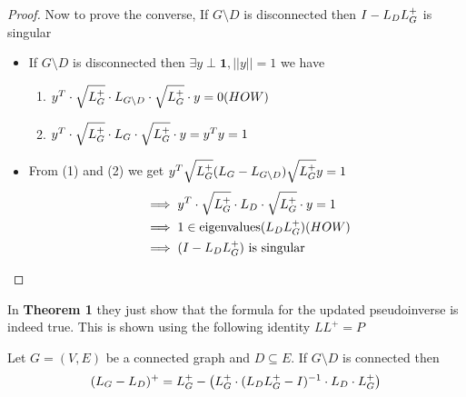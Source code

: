 \begin{proof}
Now to prove the converse, If $G \setminus D$ is disconnected then $I - L_D L_{G}^{+}$ is singular

\begin{itemize}
 \item If $G \setminus D$ is disconnected then $\exists y \perp \textbf{1}, ||y|| = 1$ we have
    
    \begin{enumerate}
     \item $ y^T \cdot \sqrt{L_{G}^{+}} \cdot L_{G \setminus D} \cdot \sqrt{L_{G}^{+}} \cdot y = 0 (HOW) $
     \item $ y^T \cdot \sqrt{L_{G}^{+}} \cdot L_G \cdot \sqrt{L_{G}^{+}} \cdot y = y^T y = 1 $
    \end{enumerate}
    
\item From (1) and (2) we get $y^T \sqrt{L_{G}^{+}} (L_G - L_{G \setminus D}) \sqrt{L_{G}^{+}} y= 1$
\begin{alignat}{1}
 & \implies y^T \cdot \sqrt{L_{G}^{+}} \cdot L_D \cdot \sqrt{L_{G}^{+}} \cdot y = 1 \\
 & \implies 1 \in \text{eigenvalues}(L_DL_{G}^{+}) (HOW)\\
 & \implies (I - L_DL_{G}^{+}) \text{ is singular}
\end{alignat}

\end{itemize}




\end{proof}



In \textbf{Theorem 1} they just show that the formula for the updated pseudoinverse is indeed true. This is shown using the following identity $L L^+ = P$
\begin{HXt} 
 Let $G=(V,E)$ be a connected graph and $D \subseteq E$. If $G \setminus D$ is connected then 
$$ (L_G - L_D)^+ = L_{G}^{+} - \left( L_{G}^{+} \cdot (L_DL_{G}^{+}-I)^{-1} \cdot L_D \cdot L_{G}^{+}\right)$$
\end{HXt}

